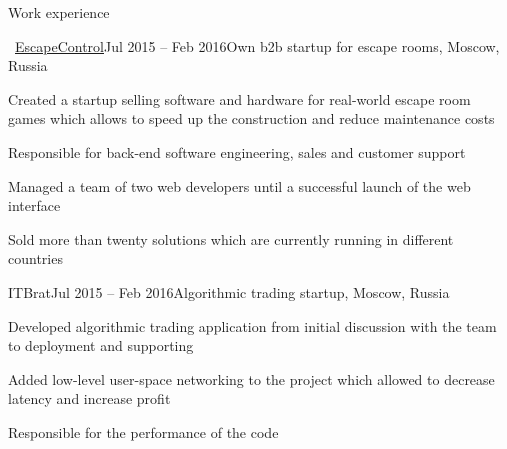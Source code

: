 \documentclass{resume} %
\begin{document}
\begin{rSection}{Work experience}
	
	\begin{rSubsection}{\faExternalLink~\href{http://escapecontrol.ru}{EscapeControl}}{Jul 2015 -- Feb 2016}{Own b2b startup for escape rooms, Moscow, Russia}{}
		\item Created a startup selling software and hardware for real-world escape room games which allows to speed up the construction and reduce maintenance costs
		\item Responsible for back-end software engineering, sales and customer support
		\item Managed a team of two web developers until a successful launch of the web interface
		\item Sold more than twenty solutions which are currently running in different countries
	\end{rSubsection}
	
	\begin{rSubsection}{ITBrat}{Jul 2015 -- Feb 2016}{Algorithmic trading startup, Moscow, Russia}{}
		\item Developed algorithmic trading application from initial discussion with the team to deployment and supporting
		\item Added low-level user-space networking to the project which allowed to decrease latency and increase profit
		\item Responsible for the performance of the code
	\end{rSubsection}
	
	
\end{rSection}
\end{document}

